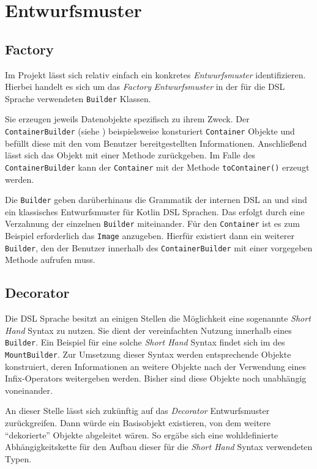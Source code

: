 \section{Entwurfsmuster}
\label{sec:entwurfsmuster}

\subsection{Factory}
\label{subsec:factory}

Im Projekt lässt sich relativ einfach ein konkretes \emph{Entwurfsmuster} identifizieren.
Hierbei handelt es sich um das \emph{Factory} \emph{Entwurfsmuster} in der für die DSL Sprache verwendeten \texttt{Builder} Klassen.

Sie erzeugen jeweils Datenobjekte spezifisch zu ihrem Zweck.
Der \texttt{ContainerBuilder} (siehe ) beispielsweise konsturiert \texttt{Container} Objekte und befüllt diese mit den vom Benutzer bereitgestellten Informationen.
Anschließend lässt sich das Objekt mit einer Methode zurückgeben.
Im Falle des \texttt{ContainerBuilder} kann der \texttt{Container} mit der Methode \texttt{toContainer()} erzeugt werden.

Die \texttt{Builder} geben darüberhinaus die Grammatik der internen DSL an und sind ein klassisches Entwurfsmuster für Kotlin DSL Sprachen.
Das erfolgt durch eine Verzahnung der einzelnen \texttt{Builder} miteinander.
Für den \texttt{Container} ist es zum Beispiel erforderlich das \texttt{Image} anzugeben.
Hierfür existiert dann ein weiterer \texttt{Builder}, den der Benutzer innerhalb des \texttt{ContainerBuilder} mit einer vorgegeben Methode aufrufen muss.

\subsection{Decorator}
\label{subsec:decorator}

Die DSL Sprache besitzt an einigen Stellen die Möglichkeit eine sogenannte \emph{Short Hand} Syntax zu nutzen.
Sie dient der vereinfachten Nutzung innerhalb eines \texttt{Builder}.
Ein Beispiel für eine solche \emph{Short Hand} Syntax findet sich im  des \texttt{MountBuilder}.
Zur Umsetzung dieser Syntax werden entsprechende Objekte konstruiert, deren Informationen an weitere Objekte nach der Verwendung eines Infix-Operators weitergeben werden.
Bisher sind diese Objekte noch unabhängig voneinander.

An dieser Stelle lässt sich zukünftig auf das \emph{Decorator} Entwurfsmuster zurückgreifen.
Dann würde ein Basisobjekt existieren, von dem weitere \enquote{dekorierte} Objekte abgeleitet wären.
So ergäbe sich eine wohldefinierte Abhängigkeitskette für den Aufbau dieser für die \emph{Short Hand} Syntax verwendeten Typen.
